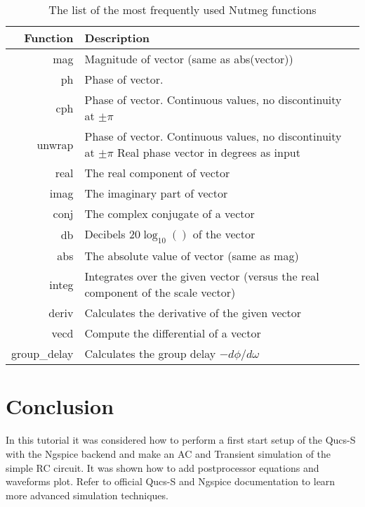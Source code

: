 \begin{table}[!ht]
\caption{The list of the most frequently used Nutmeg functions}
 \begin{tabularx}{\textwidth}{|r|X|}
\hline
Function & Description \\
\hline
mag & Magnitude of vector (same as abs(vector)) \\
ph & Phase of vector. \\
cph & Phase of vector. Continuous values, no discontinuity at $\pm\pi$ \\
unwrap & Phase of vector. Continuous values, no discontinuity at $\pm\pi$ Real phase vector in degrees as input \\
real & The real component of vector \\
imag & The imaginary part of vector\\
conj & The complex conjugate of a vector \\
db & Decibels $20 \log_{10}()$ of the vector \\
abs & The absolute value of vector (same as mag) \\
integ & Integrates over the given vector (versus the real component of the scale vector) \\
deriv & Calculates the derivative of the given vector \\
vecd & Compute the differential of a vector \\
group\_delay & Calculates the group delay $-d\phi/d\omega$ \\
\hline
\end{tabularx}
\end{table}

\section{Conclusion}

In this tutorial it was considered how to perform a first start setup of the Qucs-S with the Ngspice backend and make an AC and Transient simulation of the simple RC circuit. It was shown how to add postprocessor equations and waveforms plot. Refer to official Qucs-S and Ngspice documentation to learn more advanced simulation techniques.

\endinput




